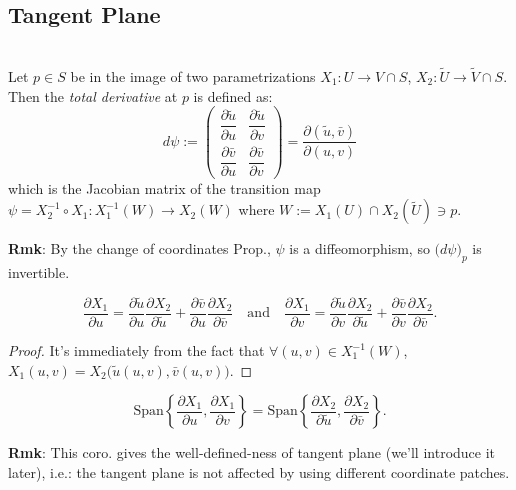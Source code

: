 \subsection{Tangent Plane}

\\
Let $p\in S$ be in the image of two parametrizations $X_1: U\to V\cap S$, $X_2: \tilde{U}\to\tilde{V}\cap S$. Then the \textit{total derivative} at $p$ is defined as:
\[
d\psi := \begin{pmatrix}\dfrac{\partial\tilde{u}}{\partial u} & \dfrac{\partial\tilde{u}}{\partial v}\\[3mm] \dfrac{\partial\bar{v}}{\partial u} & \dfrac{\partial\bar{v}}{\partial v}\end{pmatrix} = \frac{\partial(\tilde{u}, \bar{v})}{\partial(u, v)}
\]
which is the Jacobian matrix of the transition map $\psi = X_2^{-1}\circ X_1: X_1^{-1}(W)\to X_2(W)$ where $W := X_1(U)\cap X_2(\tilde{U})\ni p$.

\noindent\textbf{Rmk}: By the change of coordinates Prop., $\psi$ is a diffeomorphism, so $\big(d\psi\big)_p$ is invertible.

\begin{proposition}
\[
\frac{\partial X_1}{\partial u} = \frac{\partial\tilde{u}}{\partial u}\frac{\partial X_2}{\partial\tilde{u}} + \frac{\partial\bar{v}}{\partial u}\frac{\partial X_2}{\partial\bar{v}} \quad\text{and}\quad \frac{\partial X_1}{\partial v} = \frac{\partial\tilde{u}}{\partial v}\frac{\partial X_2}{\partial\tilde{u}} + \frac{\partial\bar{v}}{\partial v}\frac{\partial X_2}{\partial\bar{v}}.
\]
\end{proposition}

\begin{proof}
It's immediately from the fact that $\forall(u, v)\in X_1^{-1}(W)$, $X_1(u, v) = X_2\big(\tilde{u}(u, v), \bar{v}(u, v)\big)$.
\end{proof}

\begin{corollary}
\[
\mathrm{Span}\left\{\frac{\partial X_1}{\partial u}, \frac{\partial X_1}{\partial v}\right\} = \mathrm{Span}\left\{\frac{\partial X_2}{\partial\tilde{u}}, \frac{\partial X_2}{\partial\bar{v}}\right\}.
\]
\end{corollary}

\noindent\textbf{Rmk}: This coro. gives the well-defined-ness of tangent plane (we'll introduce it later), i.e.: the tangent plane is not affected by using different coordinate patches.

